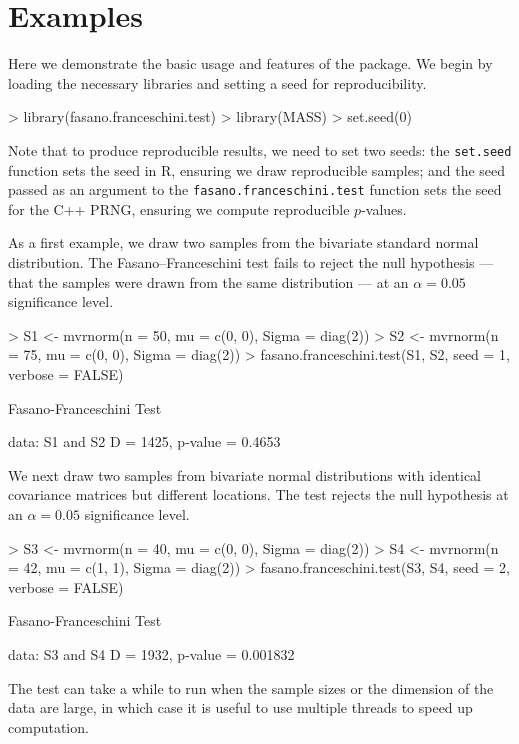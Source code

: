 
\section{Examples}
Here we demonstrate the basic usage and features of the  package. We begin by loading the necessary libraries and setting a seed for reproducibility.
\begin{example}
> library(fasano.franceschini.test)
> library(MASS)
> set.seed(0)
\end{example}
Note that to produce reproducible results, we need to set two seeds: the \texttt{set.seed} function sets the seed in R, ensuring we draw reproducible samples; and the seed passed as an argument to the \texttt{fasano.franceschini.test} function sets the seed for the C++ PRNG, ensuring we compute reproducible $p$-values.

As a first example, we draw two samples from the bivariate standard normal distribution. The Fasano--Franceschini test fails to reject the null hypothesis --- that the samples were drawn from the same distribution --- at an $\alpha=0.05$ significance level.

\begin{example}
> S1 <- mvrnorm(n = 50, mu = c(0, 0), Sigma = diag(2))
> S2 <- mvrnorm(n = 75, mu = c(0, 0), Sigma = diag(2))
> fasano.franceschini.test(S1, S2, seed = 1, verbose = FALSE)

	Fasano-Franceschini Test

data:  S1 and S2
D = 1425, p-value = 0.4653
\end{example}

We next draw two samples from bivariate normal distributions with identical covariance matrices but different locations. The test rejects the null hypothesis at an $\alpha=0.05$ significance level.

\begin{example}
> S3 <- mvrnorm(n = 40, mu = c(0, 0), Sigma = diag(2))
> S4 <- mvrnorm(n = 42, mu = c(1, 1), Sigma = diag(2))
> fasano.franceschini.test(S3, S4, seed = 2, verbose = FALSE)

	Fasano-Franceschini Test

data:  S3 and S4
D = 1932, p-value = 0.001832
\end{example}

The test can take a while to run when the sample sizes or the dimension of the data are large, in which case it is useful to use multiple threads to speed up computation.

